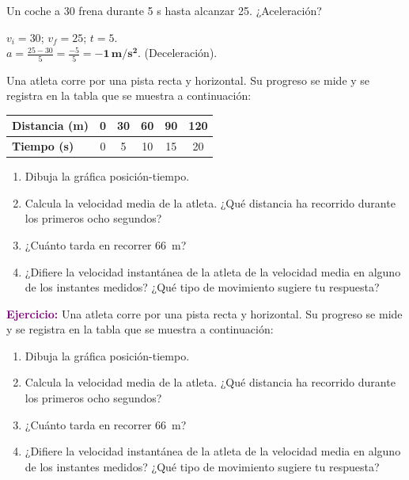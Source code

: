 \begin{exercise}
    Un coche a \qty{30}{\mps} frena durante 5 s hasta alcanzar \qty{25}{\mps}. ¿Aceleración?
    \begin{solu}
        $v_i = 30$; $v_f = 25$; $t = 5$. \\
        $a = \frac{25 - 30}{5} = \frac{-5}{5} = \mathbf{-1\,m/s^2}$. (Deceleración).
    \end{solu}
\end{exercise}


\begin{exercise}
    Una atleta corre por una pista recta y horizontal. Su progreso se mide y se registra en la tabla que se muestra a continuación:
    \begin{table}[H]
        \centering
        \renewcommand{\arraystretch}{1.5}
        \begin{tabular}{Occccc}
            \bottomrule
            \textcolor{ocre}{\textbf{Distancia (\unit{\metre})}} & 0 & 30 & 60 & 90 & 120 \\
            \hline
            \textcolor{ocre}{\textbf{Tiempo (\unit{\s})}}         & 0 & 5  & 10 & 15 & 20  \\
            \toprule
        \end{tabular}
        \label{tab:ejercicio2}
    \end{table}

    \begin{enumerate}[label=\letraminuscula]
    \item Dibuja la gráfica posición-tiempo.
    \item Calcula la velocidad media de la atleta. ¿Qué distancia ha recorrido durante los primeros ocho segundos?
    \item ¿Cuánto tarda en recorrer \qty{66}{\m}?
    \item ¿Difiere la velocidad instantánea de la atleta de la velocidad media en alguno de los instantes medidos? ¿Qué tipo de movimiento sugiere tu respuesta?
    \end{enumerate}

    \begin{solu}
        \textbf{\textcolor{purple}{Ejercicio:}} Una atleta corre por una pista recta y horizontal. Su progreso se mide y se registra en la tabla que se muestra a continuación:
        \begin{enumerate}[label=\letraminuscula]
            \item Dibuja la gráfica posición-tiempo.
            \item Calcula la velocidad media de la atleta. ¿Qué distancia ha recorrido durante los primeros ocho segundos?
            \item ¿Cuánto tarda en recorrer \qty{66}{\m}?
            \item ¿Difiere la velocidad instantánea de la atleta de la velocidad media en alguno de los instantes medidos? ¿Qué tipo de movimiento sugiere tu respuesta?
        \end{enumerate}


\end{solu}
\end{exercise}
